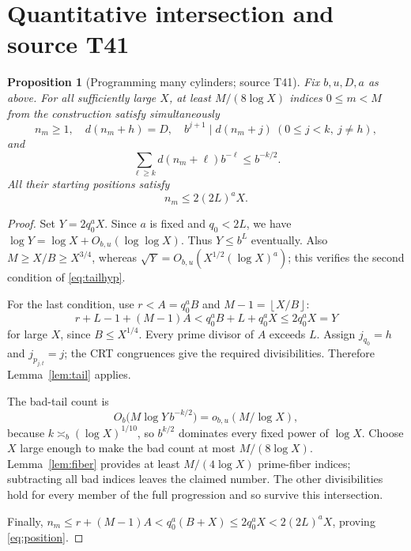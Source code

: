 \documentclass[11pt,a4paper]{article}
\newtheorem{proposition}[theorem]{Proposition}
\theoremstyle{definition}\newtheorem{definition}[theorem]{Definition}
\theoremstyle{remark}\newtheorem{remark}[theorem]{Remark}
\newcommand{\floor}[1]{\left\lfloor #1\right\rfloor}\newcommand{\ceil}[1]{\left\lceil #1\right\rceil}
\begin{document}
\section{Quantitative intersection and source T41}
\begin{proposition}[Programming many cylinders; source T41]\label{prop:program}
Fix $b,u,D,a$ as above. For all sufficiently large $X$, at least $M/(8\log X)$ indices $0\le m<M$ from the construction satisfy simultaneously
\[
 n_m\ge1,\quad d(n_m+h)=D,\quad
 b^{j+1}\mid d(n_m+j)\ (0\le j<k,\ j\ne h),
\]
and
\[
 \sum_{\ell\ge k}d(n_m+\ell)b^{-\ell}\le b^{-k/2}.
\]
All their starting positions satisfy
\begin{equation}\label{eq:position}
 n_m\le2(2L)^a X.
\end{equation}
\end{proposition}
\begin{proof}
Set $Y=2q_0^aX$. Since $a$ is fixed and $q_0<2L$, we have $\log Y=\log X+O_{b,u}(\log\log X)$. Thus $Y\le b^L$ eventually. Also $M\ge X/B\ge X^{3/4}$, whereas $\sqrt Y=O_{b,u}(X^{1/2}(\log X)^a)$; this verifies the second condition of \eqref{eq:tailhyp}.

For the last condition, use $r<A=q_0^aB$ and $M-1=\floor{X/B}$:
\[
 r+L-1+(M-1)A<q_0^aB+L+q_0^aX\le2q_0^aX=Y
\]
for large $X$, since $B\le X^{1/4}$. Every prime divisor of $A$ exceeds $L$. Assign $j_{q_0}=h$ and $j_{p_{j,t}}=j$; the CRT congruences give the required divisibilities. Therefore Lemma~\ref{lem:tail} applies.

The bad-tail count is
\[
 O_b\bigl(M\log Y\,b^{-k/2}\bigr)=o_{b,u}(M/\log X),
\]
because $k\asymp_b(\log X)^{1/10}$, so $b^{k/2}$ dominates every fixed power of $\log X$. Choose $X$ large enough to make the bad count at most $M/(8\log X)$. Lemma~\ref{lem:fiber} provides at least $M/(4\log X)$ prime-fiber indices; subtracting all bad indices leaves the claimed number. The other divisibilities hold for every member of the full progression and so survive this intersection.

Finally, $n_m\le r+(M-1)A<q_0^a(B+X)\le2q_0^aX<2(2L)^aX$, proving \eqref{eq:position}.
\end{proof}
\end{document}
